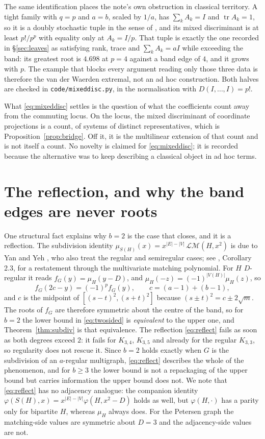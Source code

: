 \documentclass[11pt]{article}
\theoremstyle{remark}
\begin{document}
The same identification places the note's own obstruction in classical territory. A tight family
with $q=p$ and $a=b$, scaled by $1/a$, has $\sum_kA_k=I$ and $\operatorname{tr}A_k=1$, so it is a
doubly stochastic tuple in the sense of \cite{Gurvits}, and its mixed discriminant is at least
$p!/p^p$ with equality only at $A_k=I/p$. That tuple is exactly the one recorded in
\S\ref{sec:leaves} as satisfying rank, trace and $\sum_kA_k=aI$ while exceeding the band: its
greatest root is $4.698$ at $p=4$ against a band edge of $4$, and it grows with $p$. The example
that blocks every argument reading only those three data is therefore the van der Waerden extremal,
not an ad hoc construction. Both halves are checked in \texttt{code/mixeddisc.py}, in the
normalisation with $D(I,\dots,I)=p!$.

What \eqref{eq:mixeddisc} settles is the question of what the coefficients count away from the
commuting locus. On the locus, the mixed discriminant of coordinate projections is a count, of
systems of distinct representatives, which is Proposition~\ref{prop:bridge}. Off it, it is the
multilinear extension of that count and is not itself a count. No novelty is claimed for
\eqref{eq:mixeddisc}; it is recorded because the alternative was to keep describing a classical
object in ad hoc terms.


\section{The reflection, and why the band edges are never roots}

One structural fact explains why $b=2$ is the case that closes, and it is a
reflection. The subdivision identity
$\mu_{S(H)}(x)=x^{|E|-|V|}\,\mathcal{LM}(H,x^2)$ is due to Yan and Yeh
\cite{YY}, who also treat the regular and semiregular cases; see
\cite{WWM}, Corollary 2.3, for a restatement through the multivariate matching
polynomial. For $H$ $D$-regular it reads $f_G(y)=\mu_H(y-D)$, and
$\mu_H(-z)=(-1)^{|V(H)|}\mu_H(z)$, so
\begin{equation}\label{eq:reflect}
f_G(2c-y)=(-1)^{p}f_G(y),\qquad c=(a-1)+(b-1),
\end{equation}
and $c$ is the midpoint of $[(s-t)^2,(s+t)^2]$ because $(s\pm t)^2=c\pm2\sqrt m$.
The roots of $f_G$ are therefore symmetric about the centre of the band, so for
$b=2$ the lower bound in \eqref{eq:twosided} is \emph{equivalent} to the upper
one, and Theorem~\ref{thm:subdiv} is that equivalence. The reflection
\eqref{eq:reflect} fails as soon as both degrees exceed $2$: it fails for
$K_{3,4}$, $K_{3,5}$ and already for the regular $K_{3,3}$, so regularity does
not rescue it. Since $b=2$ holds exactly when $G$ is the subdivision of an
$a$-regular multigraph, \eqref{eq:reflect} describes the whole of the
phenomenon, and for $b\ge3$ the lower bound is not a repackaging of the upper
bound but carries information the upper bound does not. We note that
\eqref{eq:reflect} has no adjacency analogue: the companion identity
$\varphi(S(H),x)=x^{|E|-|V|}\varphi(H,x^2-D)$ holds as well, but $\varphi(H,\cdot)$
has a parity only for bipartite $H$, whereas $\mu_H$ always does. For the
Petersen graph the matching-side values are symmetric about $D=3$ and the
adjacency-side values are not.
\end{document}

